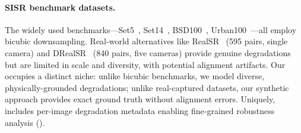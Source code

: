 \paragraph{SISR benchmark datasets.}
The widely used benchmarks---Set5~\cite{bevilacqua2012low}, Set14~\cite{zeyde2010single}, BSD100~\cite{martin2001database}, Urban100~\cite{huang2015single}---all employ bicubic downsampling.
Real-world alternatives like RealSR~\cite{cai2019toward} (595 pairs, single camera) and DRealSR~\cite{wei2020component} (840 pairs, five cameras) provide genuine degradations but are limited in scale and diversity, with potential alignment artifacts.
Our \dataset occupies a distinct niche: unlike bicubic benchmarks, we model diverse, physically-grounded degradations; unlike real-captured datasets, our synthetic approach provides exact ground truth without alignment errors.
Uniquely, \dataset includes per-image degradation metadata enabling fine-grained robustness analysis ().

\begin{table}[t]
\centering
\caption{\textbf{Comparison of SISR benchmark datasets.} \dataset uniquely combines large scale, diverse categories, complex degradations, and per-image metadata.}
\label{tab:dataset_comparison}
\end{table}
